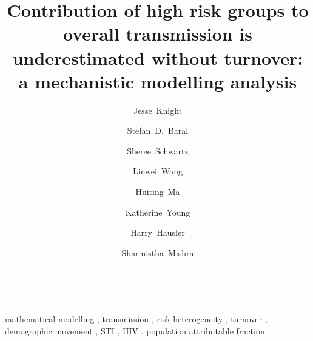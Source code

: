 \begin{frontmatter}
~\\[-6em] %
\title{Contribution of high risk groups to overall transmission
  is underestimated without turnover:
  a mechanistic modelling analysis
}
\author[MAP]{Jesse~Knight}
\author[JHU]{Stefan~D.~Baral}
\author[JHU]{Sheree~Schwartz}
\author[MAP]{Linwei~Wang}
\author[MAP]{Huiting~Ma}
\author[THC]{Katherine~Young}  %
\author[THC]{Harry~Hausler}      
\author[MAP,IDM,IHP,IMS]{Sharmistha~Mishra}
\address[MAP]{MAP Centre for Urban Health Solutions, Unity Health Toronto}
\address[JHU]{Deptartment of Epidemiology, Johns Hopkins Bloomberg School of Public Health}
\address[THC]{TB HIV Care, South Africa}
\address[IDM]{Department of Medicine, Division of Infectious Disease, University of Toronto}
\address[IHP]{Institute of Health Policy, Management and Evaluation,
  Dalla Lana School of Public Health, University of Toronto}
\address[IMS]{Instituof Medical Sciences, University of Toronto}
\begin{abstract}
  
\end{abstract}
\begin{keyword}
  mathematical modelling \sep
  transmission \sep
  risk heterogeneity \sep
  turnover \sep
  demographic movement \sep
  STI \sep
  HIV \sep
  population attributable fraction
\end{keyword}
\end{frontmatter}
